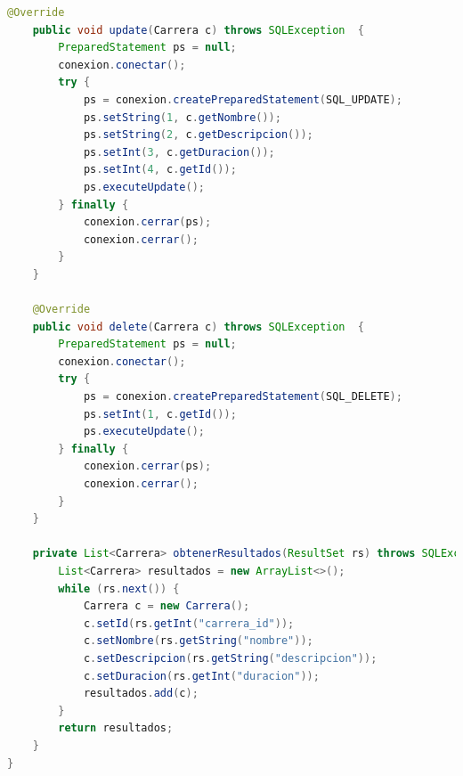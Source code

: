 \documentclass[a4paper,12pt]{article}
\begin{document}
\begin{lstlisting}[language=Java, style=customJava, 
caption={CarreraDAO.java},captionpos=b,basicstyle=\fontfamily{cmss}\small]
    @Override
    public void update(Carrera c) throws SQLException  {
        PreparedStatement ps = null;
        conexion.conectar();
        try {
            ps = conexion.createPreparedStatement(SQL_UPDATE);
            ps.setString(1, c.getNombre());
            ps.setString(2, c.getDescripcion());
            ps.setInt(3, c.getDuracion());
            ps.setInt(4, c.getId());
            ps.executeUpdate();
        } finally {
            conexion.cerrar(ps);
            conexion.cerrar();
        }
    }

    @Override
    public void delete(Carrera c) throws SQLException  {
        PreparedStatement ps = null;
        conexion.conectar();
        try {
            ps = conexion.createPreparedStatement(SQL_DELETE);
            ps.setInt(1, c.getId());
            ps.executeUpdate();
        } finally {
            conexion.cerrar(ps);
            conexion.cerrar();
        }
    }

    private List<Carrera> obtenerResultados(ResultSet rs) throws SQLException {
        List<Carrera> resultados = new ArrayList<>();
        while (rs.next()) {
            Carrera c = new Carrera();
            c.setId(rs.getInt("carrera_id"));
            c.setNombre(rs.getString("nombre"));
            c.setDescripcion(rs.getString("descripcion"));
            c.setDuracion(rs.getInt("duracion"));
            resultados.add(c);
        }
        return resultados;
    }
}
\end{lstlisting}
\end{document}
